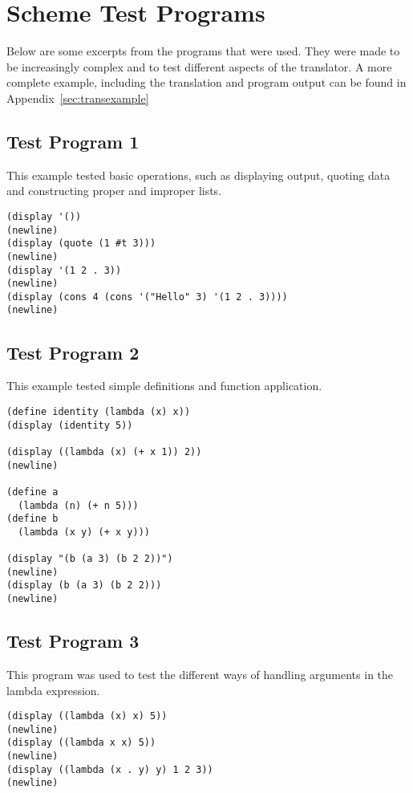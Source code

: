 \section{Scheme Test Programs}

Below are some excerpts from the programs that were used. They were made to be
increasingly complex and to test different aspects of the translator. A more
complete example, including the translation and program output can be found in
Appendix~\ref{sec:transexample}

\subsection{Test Program 1}
This example tested basic operations, such as displaying output, quoting data
and constructing proper and improper lists.
\begin{framed}
\begin{verbatim}
(display '())
(newline)
(display (quote (1 #t 3)))
(newline)
(display '(1 2 . 3))
(newline)
(display (cons 4 (cons '("Hello" 3) '(1 2 . 3))))
(newline)
\end{verbatim}
\end{framed}

\subsection{Test Program 2}
This example tested simple definitions and function application.
\begin{framed}
\begin{verbatim}
(define identity (lambda (x) x))
(display (identity 5))

(display ((lambda (x) (+ x 1)) 2))
(newline)

(define a
  (lambda (n) (+ n 5)))
(define b
  (lambda (x y) (+ x y)))

(display "(b (a 3) (b 2 2))")
(newline)
(display (b (a 3) (b 2 2)))
(newline)
\end{verbatim}
\end{framed}

\subsection{Test Program 3}
This program was used to test the different ways of handling arguments in the
lambda expression.
\begin{framed}
\begin{verbatim}
(display ((lambda (x) x) 5))
(newline)
(display ((lambda x x) 5))
(newline)
(display ((lambda (x . y) y) 1 2 3))
(newline)
\end{verbatim}
\end{framed}

